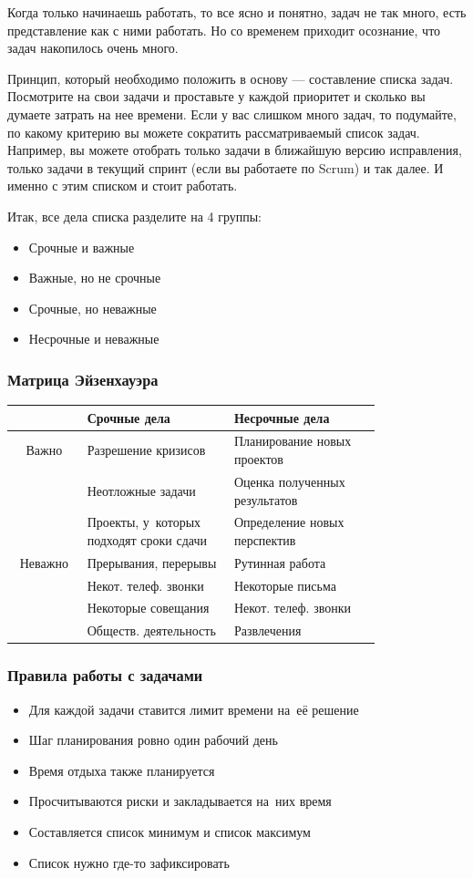 \documentclass{../industrial-development}
\begin{document}
\lecturenotes

Когда только начинаешь работать, то все ясно и понятно, задач не так много, есть представление как с ними работать. Но со временем приходит осознание, что задач накопилось очень много.

Принцип, который необходимо положить в основу — составление списка задач. Посмотрите на свои задачи и проставьте у каждой приоритет и сколько вы думаете затрать на нее времени. Если у вас слишком много задач, то подумайте, по какому критерию вы можете сократить рассматриваемый список задач. Например, вы можете отобрать только задачи в ближайшую версию исправления, только задачи в текущий спринт (если вы работаете по Scrum) и так далее. И именно с этим списком и стоит работать.

Итак, все дела списка разделите на 4 группы:
\begin{itemize}
\item Срочные и важные
\item Важные, но не срочные
\item Срочные, но неважные
\item Несрочные и неважные~\cite{TMHabr}
\end{itemize}

\begin{frame} \frametitle{Матрица Эйзенхауэра}
  \begin{table}
    \begin{tabular}{|c|p{0.4\linewidth}|p{0.4\linewidth}|}
		\hline
		 & Срочные дела & Несрочные дела \\
		\hline
		Важно & Разрешение кризисов & Планирование новых проектов \\
		 & Неотложные задачи & Оценка полученных результатов \\
		 & Проекты, у~которых подходят сроки сдачи & Определение новых перспектив \\
		\hline
		Неважно & Прерывания, перерывы & Рутинная работа \\
		 & Некот. телеф. звонки & Некоторые письма \\
		 & Некоторые совещания & Некот. телеф. звонки \\
		 & Обществ. деятельность & Развлечения \\
		\hline
    \end{tabular}
  \end{table}
\end{frame}

\begin{frame} \frametitle{Правила работы с задачами}
  \begin{itemize}
  \item Для каждой задачи ставится лимит времени на~её решение
  \item Шаг планирования ровно один рабочий день
  \item Время отдыха также планируется
  \item Просчитываются риски и закладывается на~них время
  \item Составляется список минимум и список максимум
  \item Список нужно где-то зафиксировать
  \end{itemize}
\end{frame}
\end{document}
